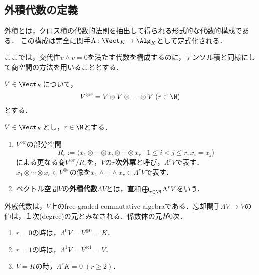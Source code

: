 \documentclass[uplatex,dvipdfmx]{jsreport}
\begin{document}
\subsection{外積代数の定義}

\begin{tcolorbox}[colframe=ForestGreen, colback=ForestGreen!10!white, breakable,
    title=外積]
    外積とは，クロス積の代数的法則を抽出して得られる形式的な代数的構成である．
    この構成は完全に関手$\Lambda:\Vect_K\to\Alg_K$として定式化される．

    ここでは，交代性$v\wedge v=0$を満たす代数を構成するのに，テンソル積と同様にして商空間の方法を用いることとする．
\end{tcolorbox}

\begin{notation}
    $V\in\Vect_K$について，
    \[V^{\otimes r}=V\otimes V\otimes\cdots\otimes V\;(r\in\N)\]
    とする．
\end{notation}

\begin{definition}
    $V\in\Vect_K$とし，$r\in\N$とする．
    \begin{enumerate}
        \item $V^{\otimes r}$の部分空間
        \[R_r:=\langle x_1\otimes\cdots\otimes x_i\otimes\cdots\otimes x_r\mid 1\le i<j\le r,x_i=x_j\rangle\]
        による更なる商$V^{\otimes r}/R_r$を，$V$の\textbf{$r$次外冪}と呼び，$\Lambda^rV$で表す．
        $x_1\otimes\cdots\otimes x_r\in V^{\otimes r}$の像を$x_1\wedge\cdots\wedge x_r\in\Lambda^rV$で表す．
        \item ベクトル空間$V$の\textbf{外積代数}$\Lambda V$とは，直和$\bigoplus_{r\in\N}\Lambda^rV$をいう．
    \end{enumerate}
\end{definition}
\begin{remarks}
    外戚代数は，$V$上のfree graded-commutative algebraである．忘却関手$\Lambda V\to V$の値は，１次(degree)の元とみなされる．係数体の元が$0$次．
\end{remarks}
\begin{example}\mbox{}
    \begin{enumerate}
        \item $r=0$の時は，$\Lambda^0V=V^{\otimes 0}=K$．
        \item $r=1$の時は，$\Lambda^1V=V^{\otimes 1}=V$．
        \item $V=K$の時，$\Lambda^rK=0\;(r\ge 2)$．
    \end{enumerate}
\end{example}
\end{document}
